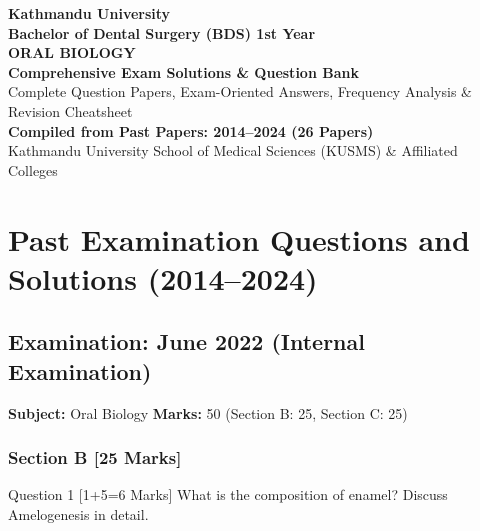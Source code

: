\documentclass[11pt,a4paper]{article}
\begin{document}
\begin{titlepage}
    \centering
    \vspace*{2cm}
    {\Huge \textbf{Kathmandu University}}\\[0.5cm]
    {\LARGE \textbf{Bachelor of Dental Surgery (BDS) 1st Year}}\\[1.5cm]
    {\Huge \textbf{ORAL BIOLOGY}}\\[0.8cm]
    {\Large \textbf{Comprehensive Exam Solutions \& Question Bank}}\\[0.5cm]
    {\large Complete Question Papers, Exam-Oriented Answers, Frequency Analysis \& Revision Cheatsheet}\\[2cm]
    \vfill
    {\large \textbf{Compiled from Past Papers: 2014--2024 (26 Papers)}}\\[0.5cm]
    {\small Kathmandu University School of Medical Sciences (KUSMS) \& Affiliated Colleges}
    \vspace*{1.5cm}
\end{titlepage}

\tableofcontents
\newpage

\section{Past Examination Questions and Solutions (2014--2024)}

\subsection{Examination: June 2022 (Internal Examination)}
\textbf{Subject:} Oral Biology \quad \textbf{Marks:} 50 (Section B: 25, Section C: 25)

\subsubsection{Section B [25 Marks]}

\begin{qbox}{Question 1 [1+5=6 Marks]}
What is the composition of enamel? Discuss Amelogenesis in detail.
\end{qbox}
\end{document}
